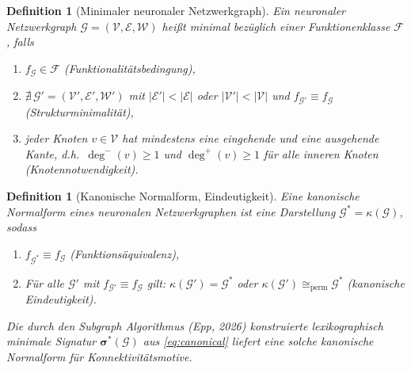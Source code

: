 \documentclass[12pt, a4paper, openany]{report}
\newtheorem{definition}[theorem]{Definition}
\newcommand{\calG}{\mathcal{G}}
\newcommand{\calV}{\mathcal{V}}
\newcommand{\calE}{\mathcal{E}}
\newcommand{\calW}{\mathcal{W}}
\newcommand{\calF}{\mathcal{F}}
\begin{document}
\begin{definition}[Minimaler neuronaler Netzwerkgraph]
\label{def:minimal_nngraph}
Ein neuronaler Netzwerkgraph $\calG = (\calV, \calE, \calW)$ heißt
\emph{minimal} bezüglich einer Funktionenklasse $\calF$, falls
\begin{enumerate}[label=(\roman*)]
  \item $f_\calG \in \calF$ (Funktionalitätsbedingung),
  \item $\nexists\, \calG' = (\calV', \calE', \calW')$ mit
        $|\calE'| < |\calE|$ oder $|\calV'| < |\calV|$ und
        $f_{\calG'} \equiv f_\calG$ (Strukturminimalität),
  \item jeder Knoten $v \in \calV$ hat mindestens eine eingehende und eine
        ausgehende Kante, d.h.\ $\deg^-(v) \geq 1$ und $\deg^+(v) \geq 1$
        für alle inneren Knoten (Knotennotwendigkeit).
\end{enumerate}
\end{definition}

\begin{definition}[Kanonische Normalform, Eindeutigkeit]
\label{def:canonical_normal_form}
Eine \emph{kanonische Normalform} eines neuronalen Netzwerkgraphen ist eine
Darstellung $\calG^* = \kappa(\calG)$, sodass
\begin{enumerate}[label=(\roman*)]
  \item $f_{\calG^*} \equiv f_\calG$ (Funktionsäquivalenz),
  \item Für alle $\calG'$ mit $f_{\calG'} \equiv f_\calG$ gilt:
        $\kappa(\calG') = \calG^*$ oder $\kappa(\calG') \cong_{\mathrm{perm}} \calG^*$
        (kanonische Eindeutigkeit).
\end{enumerate}
Die durch den Subgraph Algorithmus (Epp, 2026) konstruierte \emph{lexikographisch
minimale Signatur} $\bm{\sigma}^*(\calG)$ aus \eqref{eq:canonical} liefert
eine solche kanonische Normalform für Konnektivitätsmotive.
\end{definition}
\end{document}
